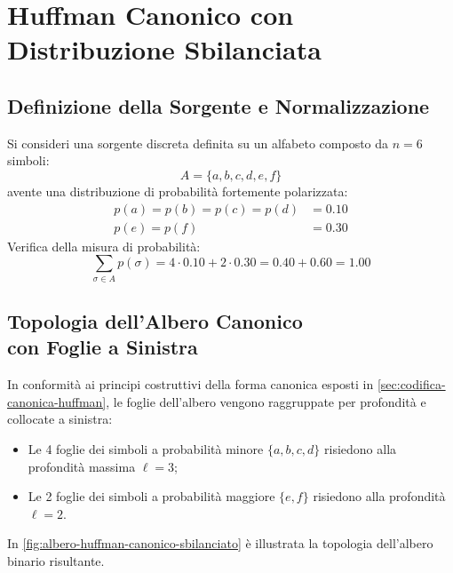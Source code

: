 \FloatBarrier
\section{Huffman Canonico con Distribuzione Sbilanciata}
\label{sec:huffman-canonico-distribuzione-sbilanciata}

\subsection{Definizione della Sorgente e Normalizzazione}
\label{subsec:definizione-sorgente-sbilanciata}

Si consideri una sorgente discreta definita su un alfabeto composto da $n = 6$ simboli:
\begin{equation}
  A = \{a, b, c, d, e, f\}
\end{equation}
avente una distribuzione di probabilit\`a fortemente polarizzata:
\begin{align}
  p(a) = p(b) = p(c) = p(d) &= 0.10 \\
  p(e) = p(f) &= 0.30
\end{align}
Verifica della misura di probabilit\`a:
\begin{equation}
  \sum_{\sigma \in A} p(\sigma) = 4 \cdot 0.10 + 2 \cdot 0.30 = 0.40 + 0.60 = 1.00
\end{equation}

\FloatBarrier
\subsection[Topologia dell'Albero Canonico]{Topologia dell'Albero Canonico\\con Foglie a Sinistra}
\label{subsec:topologia-albero-canonico-sbilanciato}

In conformit\`a ai principi costruttivi della forma canonica esposti in \autoref{sec:codifica-canonica-huffman}, le foglie dell'albero vengono raggruppate per profondit\`a e collocate a sinistra:
\begin{itemize}
  \item Le 4 foglie dei simboli a probabilit\`a minore $\{a, b, c, d\}$ risiedono alla profondit\`a massima $\ell = 3$;
  \item Le 2 foglie dei simboli a probabilit\`a maggiore $\{e, f\}$ risiedono alla profondit\`a $\ell = 2$.
\end{itemize}

In \autoref{fig:albero-huffman-canonico-sbilanciato} \`e illustrata la topologia dell'albero binario risultante.

